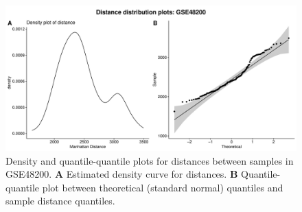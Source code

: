 \documentclass[10pt,letterpaper]{article}\usepackage[]{graphicx}\usepackage[]{color}
\begin{document}
\begin{figure}[H]
	\includegraphics[width=\textwidth]{manhattan-distance_hist_GSE48200.pdf}
	\caption{Density and quantile-quantile plots for distances between samples in GSE48200. \textbf{A} Estimated density curve for distances. \textbf{B} Quantile-quantile plot between theoretical (standard normal) quantiles and sample distance quantiles.}
\end{figure}

%
\end{document}
